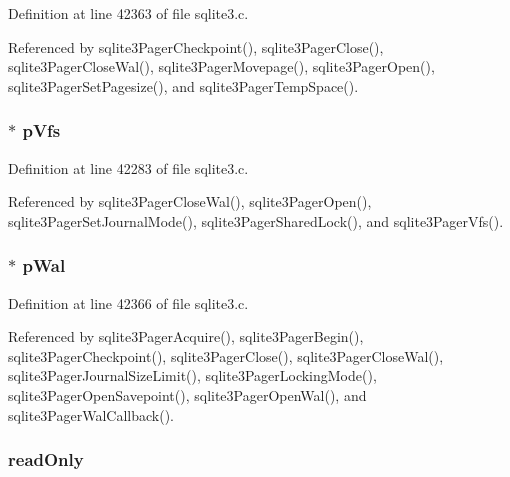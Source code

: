 Definition at line 42363 of file sqlite3.\+c.



Referenced by sqlite3\+Pager\+Checkpoint(), sqlite3\+Pager\+Close(), sqlite3\+Pager\+Close\+Wal(), sqlite3\+Pager\+Movepage(), sqlite3\+Pager\+Open(), sqlite3\+Pager\+Set\+Pagesize(), and sqlite3\+Pager\+Temp\+Space().

\hypertarget{struct_pager_a59603ca1cedf2bda0ee4e65eb610a0b5}{}
\subsubsection[{p\+Vfs}]{$\ast$ p\+Vfs}\label{struct_pager_a59603ca1cedf2bda0ee4e65eb610a0b5}


Definition at line 42283 of file sqlite3.\+c.



Referenced by sqlite3\+Pager\+Close\+Wal(), sqlite3\+Pager\+Open(), sqlite3\+Pager\+Set\+Journal\+Mode(), sqlite3\+Pager\+Shared\+Lock(), and sqlite3\+Pager\+Vfs().

\hypertarget{struct_pager_ac5f3cfd978474a39e7462844ec1a6fe1}{}
\subsubsection[{p\+Wal}]{$\ast$ p\+Wal}\label{struct_pager_ac5f3cfd978474a39e7462844ec1a6fe1}


Definition at line 42366 of file sqlite3.\+c.



Referenced by sqlite3\+Pager\+Acquire(), sqlite3\+Pager\+Begin(), sqlite3\+Pager\+Checkpoint(), sqlite3\+Pager\+Close(), sqlite3\+Pager\+Close\+Wal(), sqlite3\+Pager\+Journal\+Size\+Limit(), sqlite3\+Pager\+Locking\+Mode(), sqlite3\+Pager\+Open\+Savepoint(), sqlite3\+Pager\+Open\+Wal(), and sqlite3\+Pager\+Wal\+Callback().

\hypertarget{struct_pager_a109225a7975b2a37251bfa2079d3ad59}{}
\subsubsection[{read\+Only}]{ read\+Only}\label{struct_pager_a109225a7975b2a37251bfa2079d3ad59}


